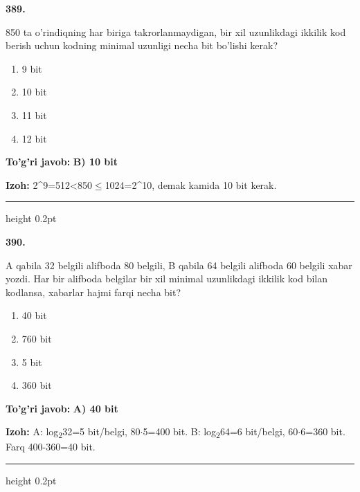 \documentclass[10pt,a4paper,oneside]{article}
\begin{document}
\noindent\textbf{\color{ink}389.}
\par
850 ta o'rindiqning har biriga takrorlanmaydigan, bir xil uzunlikdagi ikkilik kod berish uchun kodning minimal uzunligi necha bit bo'lishi kerak?
\begin{enumerate}[label=\Alph*),leftmargin=9mm]
\item 9 bit
\item 10 bit
\item 11 bit
\item 12 bit
\end{enumerate}
\begin{tcolorbox}[enhanced,breakable,colback=teal!4,colframe=teal!50!black,boxrule=0.5pt,arc=1.1mm,left=3mm,right=3mm,top=1.7mm,bottom=1.7mm,before skip=2mm,after skip=2mm]
\textbf{\color{teal}To'g'ri javob:} \textbf{B) 10 bit}
\par\smallskip
\textbf{Izoh:} 2\textasciicircum{}9=512\textless{}850\ensuremath{\leq}1024=2\textasciicircum{}10, demak kamida 10 bit kerak.
\end{tcolorbox}
\vspace{2mm}\hrule height 0.2pt \vspace{3mm}

\noindent\textbf{\color{ink}390.}
\par
A qabila 32 belgili alifboda 80 belgili, B qabila 64 belgili alifboda 60 belgili xabar yozdi. Har bir alifboda belgilar bir xil minimal uzunlikdagi ikkilik kod bilan kodlansa, xabarlar hajmi farqi necha bit?
\begin{enumerate}[label=\Alph*),leftmargin=9mm]
\item 40 bit
\item 760 bit
\item 5 bit
\item 360 bit
\end{enumerate}
\begin{tcolorbox}[enhanced,breakable,colback=teal!4,colframe=teal!50!black,boxrule=0.5pt,arc=1.1mm,left=3mm,right=3mm,top=1.7mm,bottom=1.7mm,before skip=2mm,after skip=2mm]
\textbf{\color{teal}To'g'ri javob:} \textbf{A) 40 bit}
\par\smallskip
\textbf{Izoh:} A: log\textsubscript{2}32=5 bit/belgi, 80\ensuremath{\cdot}5=400 bit. B: log\textsubscript{2}64=6 bit/belgi, 60\ensuremath{\cdot}6=360 bit. Farq 400-360=40 bit.
\end{tcolorbox}
\vspace{2mm}\hrule height 0.2pt \vspace{3mm}
\end{document}
